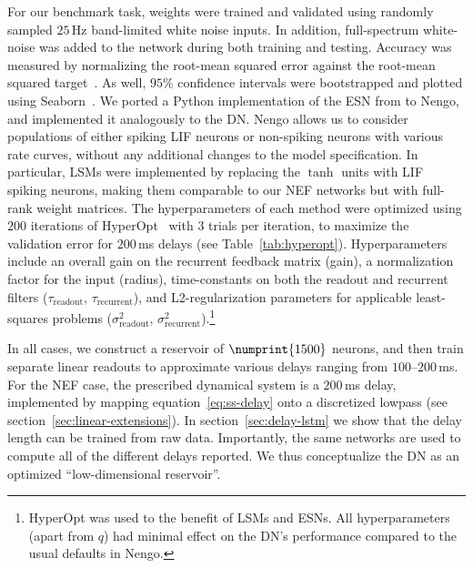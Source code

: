 For our benchmark task, weights were trained and validated using randomly sampled $25$\,Hz band-limited white noise inputs.
In addition, full-spectrum white-noise was added to the network during both training and testing.
Accuracy was measured by normalizing the root-mean squared error against the root-mean squared target~\citep[NRMSE;][]{lukovsevicius2012reservoir}.
As well, $95\%$ confidence intervals were bootstrapped and plotted using Seaborn~\citep{michael_waskom_2015_19108}.
We ported a Python implementation of the ESN from \cite{lukovsevivcius2009reservoir} to Nengo, and implemented it analogously to the DN.
Nengo allows us to consider populations of either spiking LIF neurons or non-spiking neurons with various rate curves, without any additional changes to the model specification.
In particular, LSMs were implemented by replacing the $\tanh$ units with LIF spiking neurons, making them comparable to our NEF networks but with full-rank weight matrices.
The hyperparameters of each method were optimized using $200$ iterations of HyperOpt~\citep{bergstra2013making} with $3$ trials per iteration, to maximize the validation error for $200$\,ms delays (see Table~\ref{tab:hyperopt}).
Hyperparameters include an overall gain on the recurrent feedback matrix (gain), a normalization factor for the input (radius), time-constants on both the readout and recurrent filters ($\tau_\text{readout}$, $\tau_\text{recurrent}$), and L2-regularization parameters for applicable least-squares problems ($\sigma^2_\text{readout}$, $\sigma^2_\text{recurrent}$).\footnote{%
HyperOpt was used to the benefit of LSMs and ESNs. All hyperparameters (apart from $q$) had minimal effect on the DN's performance compared to the usual defaults in Nengo.}


In all cases, we construct a reservoir of $\numprint{1500}$ neurons, and then train separate linear readouts to approximate various delays ranging from $100$--$200$\,ms.
For the NEF case, the prescribed dynamical system is a $200$\,ms delay, implemented by mapping equation~\ref{eq:ss-delay} onto a discretized lowpass (see section~\ref{sec:linear-extensions}).
In section~\ref{sec:delay-lstm} we show that the delay length can be trained from raw data.
Importantly, the same networks are used to compute all of the different delays reported.
We thus conceptualize the DN as an optimized ``low-dimensional reservoir''.


